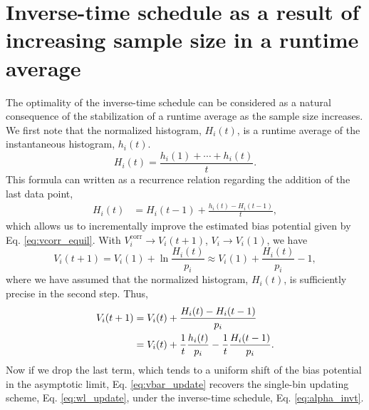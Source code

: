 \documentclass[reprint, superscriptaddress, floatfix]{revtex4-1}
\begin{document}
\appendix




\section{\label{sec:equilerr}
Inverse-time schedule as a result of increasing sample size
in a runtime average
}



The optimality of the inverse-time schedule can be considered
as a natural consequence of the stabilization of a runtime average
as the sample size increases\cite{
  marsili2006, barducci2008}.
%
We first note that the normalized histogram, $H_i(t)$,
is a runtime average of the instantaneous histogram, $h_i(t)$.
%
\begin{equation*}
  H_i(t)
  =
  \frac{ h_i(1) + \cdots + h_i(t) } { t }
  .
\end{equation*}
%
This formula can written as a recurrence relation regarding
the addition of the last data point,
%
\begin{align}
  H_i(t)
  &=
  H_i(t-1) + \frac{ h_i(t) - H_i(t-1) } { t }
  ,
  \label{eq:av_recur}
\end{align}
%
%
which allows us to incrementally improve the estimated
bias potential given by Eq. \eqref{eq:vcorr_equil}.
%
With
$V_i^\mathrm{corr} \to V_i(t+1)$, $V_i \to V_i(1)$,
we have
%
\begin{equation*}
  V_i(t+1) = V_i(1) +
  \ln \frac{ H_i(t) } { p_i }
  \approx
  V_i(1) +
  \frac{ H_i(t) } { p_i } - 1
  ,
\end{equation*}
where we have assumed that
the normalized histogram, $H_i(t)$,
is sufficiently precise in the second step.
%
%
Thus,
%
\begin{align}
  V_i(t+1)
  &=
  V_i(t)
  +
  \frac{ H_i(t) - H_i(t-1) }{ p_i }
  \notag
  \\
  &=
  V_i(t)
  +
  \frac{1}{t} \frac{ h_i(t) }{ p_i }
  -\frac{1}{t} \frac{ H_i(t-1) }{ p_i }
  .
  \label{eq:vbar_update}
\end{align}
%
Now if we drop the last term,
which tends to a uniform shift of the bias potential
in the asymptotic limit,
Eq. \eqref{eq:vbar_update} recovers
the single-bin updating scheme, Eq. \eqref{eq:wl_update},
under
the inverse-time schedule, Eq. \eqref{eq:alpha_invt}.
\end{document}

